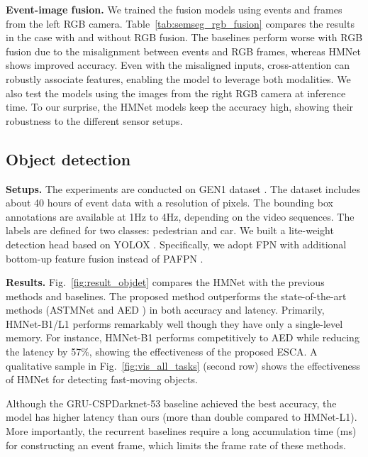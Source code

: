 \vspace{0.1cm}
\noindent
\textbf{Event-image fusion.}
We trained the fusion models using events and frames from the left RGB camera. Table~\ref{tab:semseg_rgb_fusion} compares the results in the case with and without RGB fusion.
The baselines perform worse with RGB fusion due to the misalignment between events and RGB frames, whereas HMNet shows improved accuracy.
Even with the misaligned inputs, cross-attention can robustly associate features, enabling the model to leverage both modalities.
We also test the models using the images from the right RGB camera at inference time.
To our surprise, the HMNet models keep the accuracy high, showing their robustness to the different sensor setups.

\subsection{Object detection}
\label{sec:object_detection}

\noindent
\textbf{Setups.}
The experiments are conducted on GEN1 dataset \cite{Perot2020}.
The dataset includes about 40 hours of event data with a resolution of  pixels. The bounding box annotations are available at 1Hz to 4Hz, depending on the video sequences. The labels are defined for two classes: pedestrian and car.
We built a lite-weight detection head based on YOLOX \cite{Ge2021}. Specifically, we adopt FPN \cite{Lin2017} with additional bottom-up feature fusion instead of PAFPN \cite{Ge2021}.

\vspace{0.1cm}
\noindent
\textbf{Results.}
Fig.~\ref{fig:result_objdet} compares the HMNet with the previous methods and baselines. The proposed method outperforms the state-of-the-art methods (ASTMNet \cite{Li2022} and AED \cite{Liu2022}) in both accuracy and latency.
Primarily, HMNet-B1/L1 performs remarkably well though they have only a single-level memory. For instance, HMNet-B1 performs competitively to AED \cite{Liu2022} while reducing the latency by 57\%, showing the effectiveness of the proposed ESCA. A qualitative sample in Fig.~\ref{fig:vis_all_tasks} (second row) shows the effectiveness of HMNet for detecting fast-moving objects.

Although the GRU-CSPDarknet-53 baseline achieved the best accuracy, the model has higher latency than ours (more than double compared to HMNet-L1).
More importantly, the recurrent baselines require a long accumulation time (\eg ms) for constructing an event frame, which limits the frame rate of these methods.

